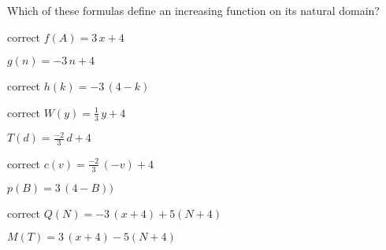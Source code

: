 \documentclass{ximera}
\author{Lee Wayand}
\begin{document}
\begin{exercise}





Which of these formulas define an increasing function on its natural domain? \\



\begin{selectAll}
\item [correct]{$f(A) = 3 \, x + 4$}
\item {$g(n) = -3 \, n + 4$}
\item [correct]{$h(k) = -3 \, (4 - k)$}
\item [correct]{$W(y) = \frac{1}{3} \, y + 4$}
\item {$T(d) = \frac{-2}{3} \, d + 4$}
\item [correct]{$c(v) = \frac{-2}{3} \, (-v) + 4$}
\item {$p(B) = 3 \, (4 - B))$}
\item [correct]{$Q(N) = -3 \, (x + 4) + 5(N + 4)$}
\item {$M(T) = 3 \, (x + 4) - 5(N + 4)$}
\end{selectAll}
















\end{exercise}
\end{document}
